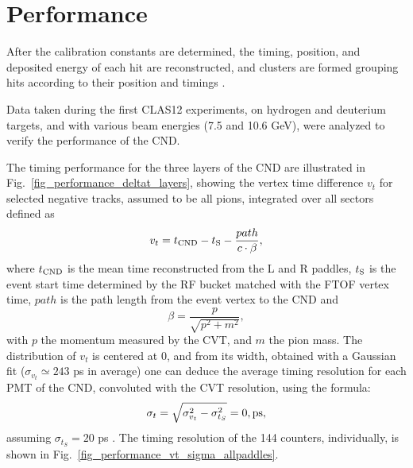 \section{Performance}
After the calibration constants are determined, the timing, position, and deposited energy of each hit are reconstructed, and clusters are formed grouping hits according to their position and timings \cite{recon-nim}.

Data taken during the first CLAS12 experiments, on hydrogen and deuterium targets, and with various beam energies (7.5 and 10.6 GeV), were analyzed to verify the performance of the CND. 

The timing performance for the three layers of the CND are illustrated in Fig.~\ref{fig_performance_deltat_layers}, showing the vertex time difference $v_t$ for selected negative tracks, assumed to be all pions, integrated over all sectors defined as
\begin{equation}\label{eq_vtp_definition}
v_t=t_{\rm{CND}}-t_{\rm{S}}-\frac{path}{c \cdot \beta} ,
\end{equation}
where $t_{\rm{CND}}$ is the mean time reconstructed from the L and R paddles, $t_{\rm{S}}$ is the event start time determined by the RF bucket matched with the FTOF vertex time, $path$ is the path length from the event vertex to the CND and
\begin{equation}\label{eq_beta_definition}
  \beta=\frac{p}{\sqrt{p^2+m^2}},
\end{equation}
with $p$ the momentum measured by the CVT, and $m$ the pion mass. 
The distribution of $v_t$ is centered at 0, and from its width, obtained with a Gaussian fit ($\sigma_{v_t}\simeq 243$ ps in average) one can deduce the average timing resolution for each PMT of the CND, convoluted with the CVT resolution, using the formula:
\begin{equation}\label{eq_resolution}
\sigma_t=\sqrt{\sigma_{v_t}^2-\sigma_{t_{S}}^2}=0 , \rm{ps}, 
\end{equation}
assuming $\sigma_{t_{S}}=20$ ps \cite{ftof-nim}.
The timing resolution of the 144 counters, individually, is shown in Fig.~\ref{fig_performance_vt_sigma_allpaddles}.
